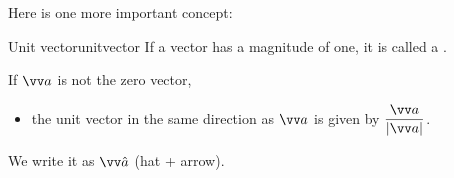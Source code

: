 \documentclass[11pt,pdfa,lastpage]{MishoNote}
\begin{document}
Here is one more important concept:
\begin{definition}{Unit vector}{unitvector}
If a vector has a magnitude of one, it is called a .
\end{definition}
If $\vc a$ is not the zero vector,
\begin{itemize}
  \item the unit vector in the same direction as $\vc a$ is given by $\dfrac{\vc a}{|\vc a|}$.
\end{itemize}
We write it as $\vc{\hat{a}}$ (hat + arrow).
\end{document}
